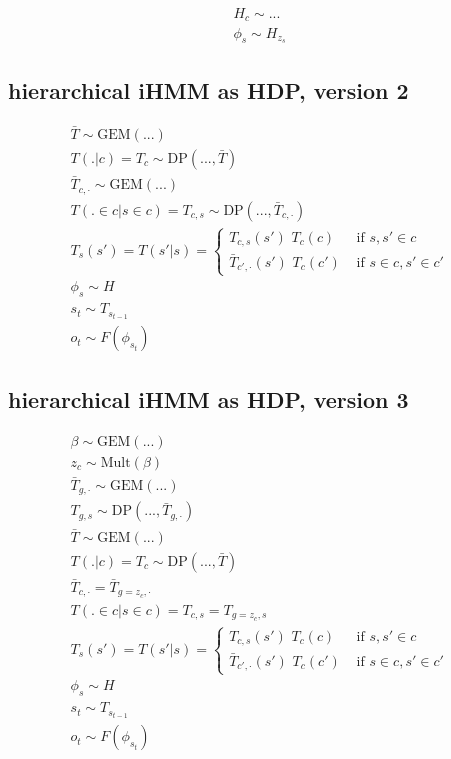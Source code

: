\documentclass[11pt]{article}
\begin{document}
\begin{align*}
H_c \sim ... \\
\phi_s \sim H_{z_s}
\end{align*}


\subsection{hierarchical iHMM as HDP, version 2}



\begin{align*}
\bar{T} \sim \text{GEM}(...) \\
T(.|c) = T_c \sim \text{DP}(..., \bar{T}) \\
\bar{T}_{c,\cdot} \sim \text{GEM}(...) \\
T(. \in c | s \in c) = T_{c,s} \sim \text{DP}(..., \bar{T}_{c,\cdot}) \\
T_s(s') = T(s'|s) = \begin{cases}  T_{c,s}(s') \,\, T_c(c) & \text{ if } s, s' \in c \\  \bar{T}_{c',\cdot}(s') \,\, T_c(c') & \text{ if } s \in c, s' \in c'  \end{cases} \\
\phi_s \sim H \\
s_t \sim T_{s_{t-1}} \\
o_t \sim F(\phi_{s_t})
\end{align*}


\subsection{hierarchical iHMM as HDP, version 3}



\begin{align*}
\beta \sim \text{GEM}(...) \\
z_c \sim \text{Mult}(\beta) \\
\bar{T}_{g,\cdot} \sim \text{GEM}(...) \\
T_{g,s} \sim \text{DP}(..., \bar{T}_{g,\cdot}) \\
\bar{T} \sim \text{GEM}(...) \\
T(.|c) = T_c \sim \text{DP}(..., \bar{T}) \\
\bar{T}_{c,\cdot} = \bar{T}_{g=z_c,\cdot} \\
T(. \in c | s \in c) = T_{c,s} = T_{g=z_c,s}\\
T_s(s') = T(s'|s) = \begin{cases}  T_{c,s}(s') \,\, T_c(c) & \text{ if } s, s' \in c \\  \bar{T}_{c',\cdot}(s') \,\, T_c(c') & \text{ if } s \in c, s' \in c'  \end{cases} \\
\phi_s \sim H \\
s_t \sim T_{s_{t-1}} \\
o_t \sim F(\phi_{s_t})
\end{align*}



\renewcommand{\refname}{Bibliography \& References Cited}

\end{document}
